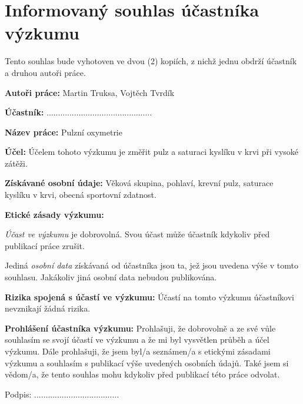 \section{Informovaný souhlas účastníka výzkumu}
\label{appn:Agreement}
\noindent Tento souhlas bude vyhotoven ve dvou (2) kopiích, z nichž jednu obdrží účastník a druhou autoři práce.\par
\noindent\textbf{Autoři práce: } Martin Truksa, Vojtěch Tvrdík\par
\noindent\textbf{Účastník: }..............................................\par
\noindent\textbf{Název práce: } Pulzní oxymetrie\par
\noindent\textbf{Účel: } Účelem tohoto výzkumu je změřit pulz a saturaci kyslíku v krvi při vysoké zátěži.\par
\noindent\textbf{Získávané osobní údaje: } Věková skupina, pohlaví, krevní pulz, saturace kyslíku v krvi, obecná sportovní zdatnost.\par
\noindent\textbf{Etické zásady výzkumu: }\par
\emph{Účast ve výzkumu} je dobrovolná. Svou účast může účastník kdykoliv před publikací práce zrušit.\par
Jediná \emph{osobní data} získávaná od účastníka jsou ta, jež jsou uvedena výše v tomto souhlasu. Jakákoliv jiná osobní data nebudou publikována.\par
\noindent\textbf{Rizika spojená s účastí ve výzkumu: } Účastí na tomto výzkumu účastníkovi nevznikají žádná rizika.\par
\noindent\textbf{Prohlášení účastníka výzkumu: } Prohlašuji, že dobrovolně a ze své vůle souhlasím se svojí účastí ve výzkumu a že mi byl vysvětlen průběh a účel výzkumu. Dále prohlašuji, že jsem byl/a seznámen/a s etickými zásadami výzkumu a souhlasím s publikací výše uvedených osobních údajů. Také jsem si vědom/a, že tento souhlas mohu kdykoliv před publikací této práce odvolat.
\vfill
\begin{flushright}Podpis: .....................................\end{flushright}